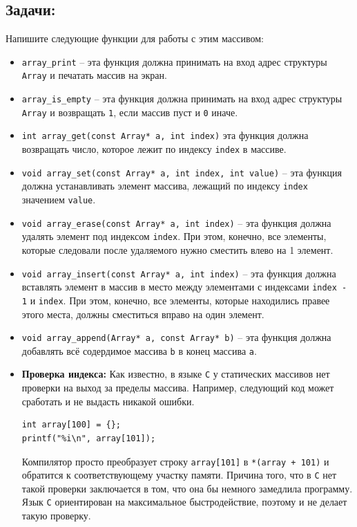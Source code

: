 \documentclass[10pt]{article}
\begin{document}
\subsection*{Задачи:} 
Напишите следующие функции для работы с этим массивом:
\begin{itemize}
\item \texttt{array\_print} -- эта функция должна принимать на вход адрес структуры \texttt{Array} и печатать массив на экран.
\item \texttt{array\_is\_empty} -- эта функция должна принимать на вход адрес структуры \texttt{Array} и возвращать \texttt{1}, если массив пуст и \texttt{0} иначе.
\item \texttt{int array\_get(const Array* a, int index)} эта функция должна возвращать число, которое лежит по индексу \texttt{index} в массиве.
\item \texttt{void array\_set(const Array* a, int index, int value)} -- эта функция должна устанавливать элемент массива, лежащий по индексу \texttt{index} значением \texttt{value}.
\item \texttt{void array\_erase(const Array* a, int index)} -- эта функция должна удалять элемент под индексом \texttt{index}. При этом, конечно, все элементы, которые следовали после удаляемого нужно сместить влево на 1 элемент.
\item \texttt{void array\_insert(const Array* a, int index)} -- эта функция должна вставлять элемент в массив в место между элементами с индексами \texttt{index - 1} и \texttt{index}. При этом, конечно, все элементы, которые находились правее этого места, должны сместиться вправо на один элемент.
\item \texttt{void array\_append(Array* a, const Array* b)} -- эта функция должна добавлять всё содердимое массива \texttt{b} в конец массива \texttt{a}.

\item \textbf{Проверка индекса:} Как известно, в языке \texttt{C} у статических массивов нет проверки на выход за пределы массива. Например, следующий код может сработать и не выдасть никакой ошибки.
\begin{lstlisting}
int array[100] = {};
printf("%i\n", array[101]);
\end{lstlisting}
Компилятор просто преобразует строку \texttt{array[101]} в \texttt{*(array + 101)} и обратится к соответствующему участку памяти.
Причина того, что в \texttt{C} нет такой проверки заключается в том, что она бы немного замедлила программу. Язык \texttt{C} ориентирован на максимальное быстродействие, поэтому и не делает такую проверку. 


\end{itemize}
\end{document}
